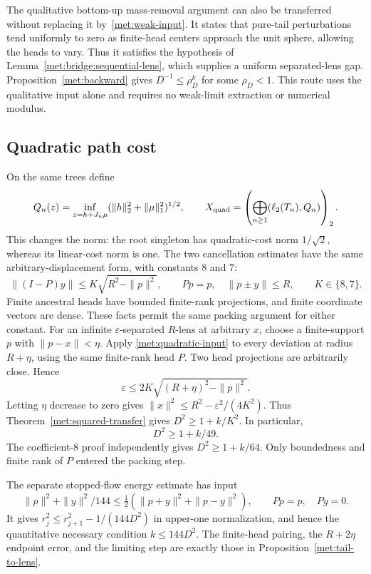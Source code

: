 The qualitative bottom-up mass-removal argument
\cite[Theorem~5.9]{TreePotentials} can also be transferred
without replacing it by~\eqref{met:weak-input}. It states that pure-tail
perturbations tend uniformly to zero as finite-head centers approach
the unit sphere, allowing the heads to vary. Thus it satisfies the
hypothesis of Lemma~\ref{met:bridge:sequential-lens}, which supplies
a uniform separated-lens gap. Proposition~\ref{met:backward} gives
$D^{-1}\le\rho_D^k$ for some $\rho_D<1$. This route uses the
qualitative input alone and requires no weak-limit extraction or
numerical modulus.

\subsection{Quadratic path cost}\label{met:quadratic-section}
On the same trees define
\[
 Q_n(z)=\inf_{z=h+J_n\mu}(\|h\|_2^2+\|\mu\|_1^2)^{1/2},\qquad
 X_{\rm quad}=\left(\bigoplus_{n\ge1}(\ell_2(T_n),Q_n)\right)_2.
\]
This changes the norm: the root singleton has quadratic-cost norm
$1/\sqrt2$, whereas its linear-cost norm is one. The two cancellation
estimates \cite[Theorem~7.6 and Proposition~7.10]{TreePotentials}
have the same arbitrary-displacement form, with constants $8$ and $7$:
\begin{equation}\label{met:quadratic-input}
 \|(I-P)y\|\le K\sqrt{R^2-\|p\|^2},
 \qquad Pp=p,\quad \|p\pm y\|\le R,\qquad K\in\{8,7\}.
\end{equation}
Finite ancestral heads have bounded finite-rank projections, and finite
coordinate vectors are dense. These facts permit the same packing
argument for either constant.
For an infinite $\varepsilon$-separated $R$-lens at arbitrary $x$, choose
a finite-support $p$ with $\|p-x\|<\eta$. Apply
\eqref{met:quadratic-input} to every deviation at radius $R+\eta$,
using the same finite-rank head $P$. Two head projections are arbitrarily
close. Hence
\[
 \varepsilon\le2K\sqrt{(R+\eta)^2-\|p\|^2}.
\]
Letting $\eta$ decrease to zero gives
$\|x\|^2\le R^2-\varepsilon^2/(4K^2)$. Thus
Theorem~\ref{met:squared-transfer} gives $D^2\ge1+k/K^2$.
In particular,
\begin{equation}\label{met:quadratic-graph}
 D^2\ge1+k/49.
\end{equation}
The coefficient-$8$ proof independently gives $D^2\ge1+k/64$.
Only boundedness and finite rank of $P$ entered the packing step.

The separate stopped-flow energy estimate
\cite[Proposition~7.8]{TreePotentials} has input
\[
 \|p\|^2+\|y\|^2/144
 \le\tfrac12(\|p+y\|^2+\|p-y\|^2),
 \qquad Pp=p,\quad Py=0.
\]
It gives $r_j^2\le r_{j+1}^2-1/(144D^2)$ in upper-one normalization,
and hence the quantitative necessary condition $k\le144D^2$.
The finite-head pairing, the $R+2\eta$ endpoint error, and the limiting
step are exactly those in Proposition~\ref{met:tail-to-lens}.

